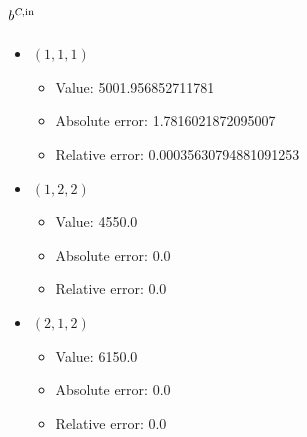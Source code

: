 \documentclass{article}%
\begin{document}
\subsection{$b^{\textsl{C},\text{in}}$}%
\begin{itemize}%
	\item $(1, 1, 1)$%
	\begin{itemize}%
		\item Value: 5001.956852711781%
		\item Absolute error: 1.7816021872095007%
		\item Relative error: 0.00035630794881091253%
	\end{itemize}%
	\item $(1, 2, 2)$%
	\begin{itemize}%
		\item Value: 4550.0%
		\item Absolute error: 0.0%
		\item Relative error: 0.0%
	\end{itemize}%
	\item $(2, 1, 2)$%
	\begin{itemize}%
		\item Value: 6150.0%
		\item Absolute error: 0.0%
		\item Relative error: 0.0%
	\end{itemize}%
\end{itemize}%
\end{document}
